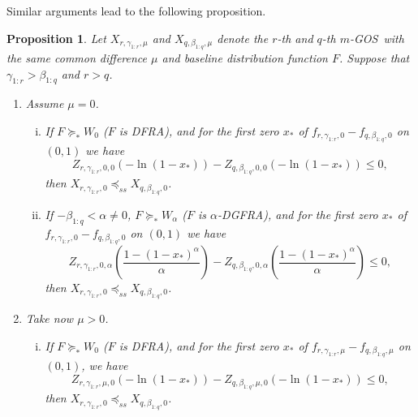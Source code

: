 \documentclass [11pt]{article}
\newtheorem{proposition}{Proposition}
\newcommand{\gos}{GOS}
\begin{document}
Similar arguments lead to the following proposition.
\begin{proposition}\label{p2}
Let $X_{r, \gamma_{1:r}, \mu}$ and $X_{q, \beta_{1:q}, \mu}$ denote the $r$-th and $q$-th $m$-\gos\ with the same common difference $\mu$
and baseline distribution function $F$. Suppose that $\gamma_{1:r} > \beta_{1:q}$ and $r > q$.
\begin{enumerate}
\item
Assume $\mu=0$.
    \begin{enumerate}[(i)]
    \item
    If %
    $F \succeq_* W_0$ ($F$ is DFRA),
    and for the first zero  $x_*$ of $f_{r, \gamma_{1:r}, 0} - f_{q,\beta_{1:q}, 0}$ on $(0,1)$ we have
    \begin{equation*}
    \label{25l}
    Z_{r, \gamma_{1:r}, 0, 0}(-\ln (1-x_*)) -
    Z_{q, \beta_{1:q}, 0, 0}(-\ln (1-x_*)) \leq 0,
    \end{equation*}
    then $X_{r,\gamma_{1:r}, 0} \preceq_{ss} X_{q, \beta_{1:q},0}$.

    \item
    If %
    $-\beta_{1:q} < \alpha \neq 0$,
    $F \succeq_* W_\alpha$ ($F$ is $\alpha$-DGFRA), and for the first zero $x_*$ of $f_{r, \gamma_{1:r}, 0} - f_{q,\beta_{1:q}, 0}$ on $(0,1)$ we have
    \begin{equation*}
    \label{25m}
    Z_{r, \gamma_{1:r}, 0, \alpha}\left(\frac{1-(1-x_*)^\alpha}{\alpha}
    \right)  -
    Z_{q, \beta_{1:q}, 0, \alpha}\left(\frac{1-(1-x_*)^\alpha}{\alpha}
    \right)  \leq 0,
    \end{equation*}
    then $X_{r,\gamma_{1:r}, 0} \preceq_{ss} X_{q, \beta_{1:q},0}$.
    \end{enumerate}

\item
Take now $\mu>0$.
    \begin{enumerate}[(i)]
    \item
    If %
    $F \succeq_* W_0$ ($F$ is DFRA),
    and for the first zero
    $x_*$ of $f_{r, \gamma_{1:r}, \mu} - f_{q,\beta_{1:q}, \mu}$ on $(0,1)$, we have
    \begin{equation*}
    \label{25n}
    Z_{r, \gamma_{1:r}, \mu, 0}(-\ln (1-x_*)) -
    Z_{q, \beta_{1:q}, \mu, 0}(-\ln (1-x_*)) \leq 0,
    \end{equation*}
    then $X_{r,\gamma_{1:r}, 0} \preceq_{ss} X_{q, \beta_{1:q},0}$.
    

\end{enumerate}
\end{enumerate}
\end{proposition}
\end{document}
